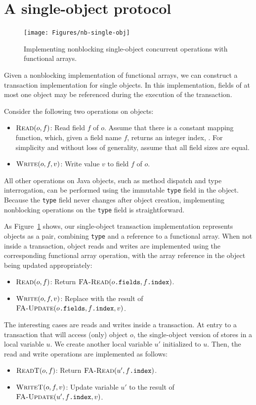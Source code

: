\section{A single-object protocol}
\begin{figure}\centering
\texttt{[image: Figures/nb-single-obj]}
\caption{Implementing nonblocking single-object concurrent operations
  with functional arrays.}
\label{fig:single-o}
\end{figure}
Given a nonblocking implementation of functional arrays, we can
construct a transaction implementation for single objects.  In
this implementation, fields of at most one object may be referenced
during the execution of the transaction.

Consider the following two operations on objects:
\begin{itemize}
\item $\text{\sc Read}(o, f)$: Read field $f$ of $o$.  Assume that
  there is a constant mapping function, which, given a field name $f$,
  returns an integer index, .
  For simplicity and without loss of generality,
  assume that all field sizes are equal.
\item $\text{\sc Write}(o, f, v)$: Write value $v$ to field $f$ of $o$.
\end{itemize}
All other operations on Java objects, such as method dispatch and type
interrogation, can be performed using the immutable {\tt type}
field in the object.  Because the {\tt type} field never changes
after object creation, implementing nonblocking operations on
the {\tt type} field is straightforward.

As Figure~\ref{fig:single-o} shows, our single-object transaction
implementation represents objects as a pair, combining {\tt type} and a
reference to a functional array.  When not inside a transaction,
object reads and writes are implemented using the
corresponding functional array operation, with the array reference in
the object being updated appropriately:
\begin{itemize}
\item $\text{\sc Read}(o, f)$:
  Return $\text{\sc FA-Read}(o\text{\tt .fields}, f\text{\tt .index})$.
\item $\text{\sc Write}(o, f, v)$: Replace  with the
  result of \linebreak
  $\text{\sc FA-Update}(o\text{\tt .fields}, f\text{\tt .index}, v)$.
\end{itemize}

The interesting cases are reads and writes inside a transaction.
At entry to a transaction that will access (only) object $o$, the
single-object version of \lapex
stores  in a local variable $u$.  We create another
local variable $u'$ initialized to $u$.  Then, the read and
write operations are implemented as follows:
\begin{itemize}
\item $\text{\sc ReadT}(o, f)$:
  Return $\text{\sc FA-Read}(u', f\text{\tt .index})$.
\item $\text{\sc WriteT}(o, f, v)$:
  Update variable $u'$ to the result of \linebreak
  $\text{\sc FA-Update}(u', f\text{\tt .index}, v)$.
\end{itemize}

